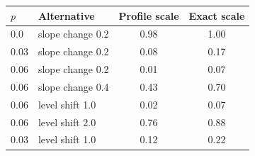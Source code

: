 \begin{tabular}{llcc}
\toprule
$p$ & Alternative & Profile scale & Exact scale \\
\midrule
0.0 & slope change 0.2 & 0.98 & 1.00 \\
0.03 & slope change 0.2 & 0.08 & 0.17 \\
0.06 & slope change 0.2 & 0.01 & 0.07 \\
0.06 & slope change 0.4 & 0.43 & 0.70 \\
0.06 & level shift 1.0 & 0.02 & 0.07 \\
0.06 & level shift 2.0 & 0.76 & 0.88 \\
0.03 & level shift 1.0 & 0.12 & 0.22 \\
\bottomrule
\end{tabular}
